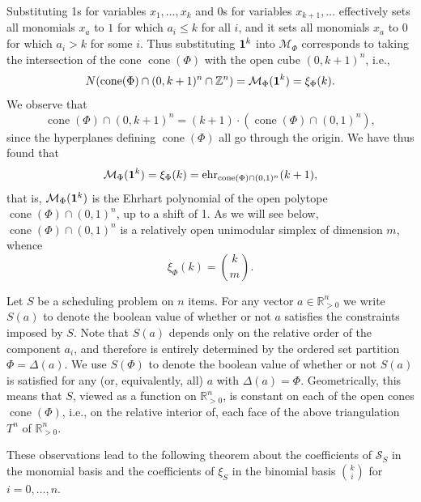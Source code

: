 \documentclass[12pt,reqno]{amsart}
\numberwithin{definition}{section}
\theoremstyle{definition}
\newcommand{\RR}{\mathbb{R}}
\newcommand{\ZZ}{\mathbb{Z}}
\newcommand{\SSS}{\mathcal{S}}
\newcommand{\ehr}{\operatorname{ehr}}
\newcommand{\cone}{\operatorname{cone}}
\newcommand{\ncM}{\mathcal{M}}
\begin{document}
Substituting 1s for variables $x_1,\ldots,x_k$ and 0s for variables $x_{k+1},\ldots$ effectively sets all monomials $x_a$ to $1$ for which $a_i \leq k$ for all $i$, and it sets all monomials $x_a$ to $0$ for which $a_i > k$ for some $i$. Thus substituting ${\bf 1}^k$ into $\ncM_\Phi$ corresponds to taking the intersection of the cone $\cone(\Phi)$ with the open cube $(0,k+1)^n$, i.e.,
\[
 N(\cone(\Phi)\cap(0,k+1)^n\cap\ZZ^n) = \ncM_\Phi({\bf 1}^k) =  \xi_\Phi(k). 
\]
We observe that
\[
  \cone(\Phi)\cap(0,k+1)^n = (k+1)\cdot (\cone(\Phi)\cap(0,1)^n), 
\]
since the hyperplanes defining $\cone(\Phi)$ all go through the origin. We have thus found that
\begin{eqnarray}
\label{eqn:spec ncM}
  \ncM_\Phi({\bf 1}^k) = \xi_\Phi(k) = \ehr_{\cone(\Phi)\cap(0,1)^n}(k+1),
\end{eqnarray}
that is, $\ncM_\Phi({\bf 1}^k)$ is the Ehrhart polynomial of the open polytope $\cone(\Phi)\cap(0,1)^n$, up to a shift of 1. As we will see below, $\cone(\Phi)\cap(0,1)^n$ is a relatively open unimodular simplex of dimension $m$, whence
\[
  \xi_\Phi(k) = \binom{k}{m}.
\]

Let $S$ be a scheduling problem on $n$ items. For any vector $a\in\RR^n_{> 0}$ we write $S(a)$ to denote the boolean value of whether or not $a$ satisfies the constraints imposed by $S$. Note that $S(a)$ depends only on the relative order of the component $a_i$, and therefore is entirely determined by the ordered set partition $\Phi=\Delta(a)$. We use $S(\Phi)$ to denote the boolean value of whether or not $S(a)$ is satisfied for any (or, equivalently, all) $a$ with $\Delta(a)=\Phi$. Geometrically, this means that $S$, viewed as a function on $\RR^n_{>0}$, is constant on each of the open cones $\cone(\Phi)$, i.e., on the relative interior of, each face of the above triangulation $T^n$ of $\RR^n_{> 0}$.

These observations lead to the following theorem about the coefficients of $\SSS_S$ in the monomial basis and the coefficients of $\xi_S$ in the binomial basis $\binom{k}{i}$ for $i=0,\ldots,n$.
\end{document}
